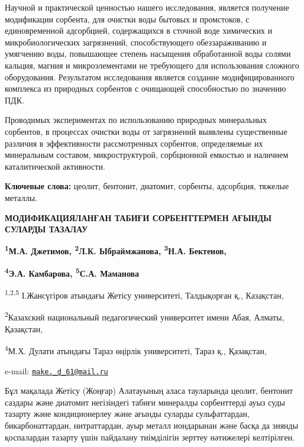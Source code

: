 Научной и практической ценностью нашего исследования, является получение
модификации сорбента, для очистки воды бытовых и промстоков, с
единовременной адсорбцией, содержащихся в сточной воде химических и
микробиологических загрязнений, способствующего обеззараживанию и
умягчению воды, повышающее степень насыщения обработанной воды солями
кальция, магния и микроэлементами не требующего для использования
сложного оборудования. Результатом исследования является создание
модифицированного комплекса из природных сорбентов с очищающей
способностью по значению ПДК.

Проводимых экспериментах по использованию природных минеральных
сорбентов, в процессах очистки воды от загрязнений выявлены существенные
различия в эффективности рассмотренных сорбентов, определяемые их
минеральным составом, микроструктурой, сорбционной емкостью и наличием
каталитической активности.

{\bfseries Ключевые слова:} цеолит, бентонит, диатомит, сорбенты,
адсорбция, тяжелые металлы.

\begin{articleheader}
{\bfseries МОДИФИКАЦИЯЛАНҒАН ТАБИҒИ СОРБЕНТТЕРМЕН АҒЫНДЫ СУЛАРДЫ ТАЗАЛАУ}

{\bfseries \textsuperscript{1}М.А. Джетимов\textsuperscript{\envelope },
\textsuperscript{2}Л.К. Ыбраймжанова, \textsuperscript{3}Н.А. Бектенов,}

{\bfseries \textsuperscript{4}Э.А. Камбарова, \textsuperscript{5}С.А.
Маманова}
\end{articleheader}

\begin{affiliation}
\textsuperscript{1,2,5} І.Жансүгіров атындағы Жетісу университеті,
Талдықорған қ., Казақстан,

\textsuperscript{2}Казахский национальный педагогический университет
имени Абая, Алматы, Қазақстан,

\textsuperscript{4}М.Х. Дулати атындағы Тараз өңірлік университеті,
Тараз қ., Қазақстан,

e-mail:
\href{mailto:make._d_61@mail.ru}{\nolinkurl{make.\_d\_61@mail.ru}}
\end{affiliation}

Бұл мақалада Жетісу (Жоңғар) Алатауының аласа тауларында цеолит,
бентонит саздары және диатомит негізіндегі табиғи минералды сорбенттерді
ауыз суды тазарту және кондиционерлеу және ағынды суларды сульфаттардан,
бикарбонаттардан, нитраттардан, ауыр металл иондарынан және басқа да
зиянды қоспалардан тазарту үшін пайдалану тиімділігін зерттеу нәтижелері
келтірілген.

